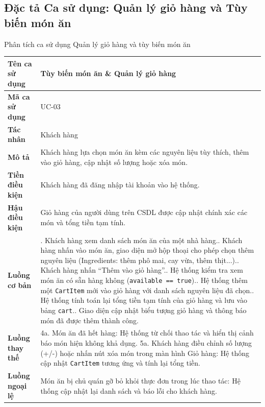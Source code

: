 \documentclass{uetgraduation}
\begin{document}
\clearpage
\subsection{Đặc tả Ca sử dụng: Quản lý giỏ hàng và Tùy biến món ăn}
\begin{table}[!htbp]{Phân tích ca sử dụng Quản lý giỏ hàng và tùy biến món ăn}
\centering
\small
\begin{tabularx}{\textwidth}{|l|>{\raggedright\arraybackslash}X|}
\hline
\textbf{Tên ca sử dụng} & \textbf{Tùy biến món ăn \& Quản lý giỏ hàng} \\ \hline
\textbf{Mã ca sử dụng} & UC-03 \\ \hline
\textbf{Tác nhân} & Khách hàng \\ \hline
\textbf{Mô tả} & Khách hàng lựa chọn món ăn kèm các nguyên liệu tùy thích, thêm vào giỏ hàng, cập nhật số lượng hoặc xóa món. \\ \hline
\textbf{Tiền điều kiện} & Khách hàng đã đăng nhập tài khoản vào hệ thống. \\ \hline
\textbf{Hậu điều kiện} & Giỏ hàng của người dùng trên CSDL được cập nhật chính xác các món và tổng tiền tạm tính. \\ \hline
\textbf{Luồng cơ bản} & 
1. Khách hàng xem danh sách món ăn của một nhà hàng.\newline
2. Khách hàng nhấn vào món ăn, giao diện mở hộp thoại cho phép chọn thêm nguyên liệu (Ingredients: thêm phô mai, cay vừa, thêm thịt...).\newline
3. Khách hàng nhấn ``Thêm vào giỏ hàng''.\newline
4. Hệ thống kiểm tra xem món ăn có sẵn hàng không (\texttt{available == true}).\newline
5. Hệ thống thêm một \texttt{CartItem} mới vào giỏ hàng với danh sách nguyên liệu đã chọn.\newline
6. Hệ thống tính toán lại tổng tiền tạm tính của giỏ hàng và lưu vào bảng \texttt{cart}.\newline
7. Giao diện cập nhật biểu tượng giỏ hàng và thông báo món đã được thêm thành công. \\ \hline
\textbf{Luồng thay thế} & 
4a. Món ăn đã hết hàng: Hệ thống từ chối thao tác và hiển thị cảnh báo món hiện không khả dụng.\newline
5a. Khách hàng điều chỉnh số lượng (+/-) hoặc nhấn nút xóa món trong màn hình Giỏ hàng: Hệ thống cập nhật \texttt{CartItem} tương ứng và tính lại tổng tiền. \\ \hline
\textbf{Luồng ngoại lệ} & 
Món ăn bị chủ quán gỡ bỏ khỏi thực đơn trong lúc thao tác: Hệ thống cập nhật lại danh sách và báo lỗi cho khách hàng. \\ \hline
\end{tabularx}
\end{table}
\end{document}
